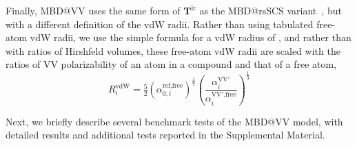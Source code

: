 Finally, MBD@VV uses the same form of $\mathbf T^\text{lr}$ as the MBD@rsSCS variant~\citep{AmbrosettiJCP14}, but with a different definition of the vdW radii.
Rather than using tabulated free-atom vdW radii, we use the simple formula for a vdW radius of \citet{FedorovPRL18}, and rather than with ratios of Hirshfeld volumes, these free-atom vdW radii are scaled with the ratios of VV polarizability of an atom in a compound and that of a free atom,\begin{equation}
  R_i^\text{vdW}=\tfrac52{(\alpha_{0,i}^\text{ref,free})}^\frac17{\left(\frac{\alpha_i^\mathrm{VV'}}{\alpha_i^\text{VV$'$,free}}\right)}^\frac13
\end{equation}

Next, we briefly describe several benchmark tests of the MBD@VV model, with detailed results and additional tests reported in the Supplemental Material.
